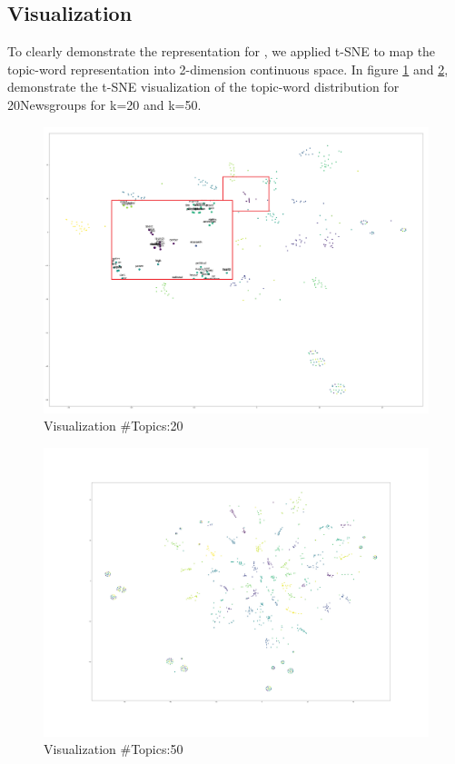 \subsection{Visualization}
To clearly demonstrate the representation for , we applied t-SNE to map the topic-word representation into 2-dimension continuous space. In figure \ref{fig:tsne20t25w2} and \ref{fig:tsne50t25w0}, demonstrate the t-SNE visualization of the topic-word distribution for 20Newsgroups for k=20 and k=50.
\begin{figure}
\centering
\includegraphics[width=1\linewidth]{figures/0908/tsne_20t_25w_2}
\caption{Visualization \#Topics:20}
\label{fig:tsne20t25w2}
\end{figure}
\begin{figure}
\centering
\includegraphics[width=1\linewidth]{figures/0908/tsne_50t_25w_0}
\caption{Visualization \#Topics:50}
\label{fig:tsne50t25w0}
\end{figure}
